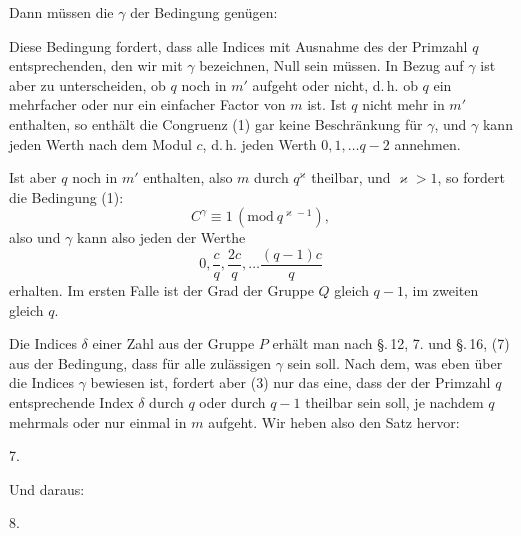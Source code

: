 
Dann müssen die $\gamma$ der Bedingung genügen:


Diese Bedingung fordert, dass alle Indices mit Ausnahme des der Primzahl $q$
entsprechenden, den wir mit $\gamma$ bezeichnen, Null sein müssen. In Bezug auf
$\gamma$ ist aber zu unterscheiden, ob $q$ noch in $m'$ aufgeht oder nicht, d.\,h.
ob $q$ ein mehrfacher oder nur ein einfacher Factor von $m$ ist. Ist $q$ nicht
mehr in $m'$ enthalten, so enthält die Congruenz (1) gar keine Beschränkung für
$\gamma$, und $\gamma$ kann jeden Werth nach dem Modul $c$, d.\,h. jeden Werth
$0, 1, \dots q - 2$ annehmen.

Ist aber $q$ noch in $m'$ enthalten, also $m$ durch $q^\varkappa$ theilbar, und $\varkappa > 1$,
so fordert die Bedingung (1):
\[
C^\gamma \equiv 1 \, (\mathrm{mod}\ q^{\varkappa-1}),
\]
also
und $\gamma$ kann also jeden der Werthe
\[
0, \dfrac{c}{q}, \dfrac{2c}{q}, \dots \dfrac{(q-1)c}{q}
\]
erhalten. Im ersten Falle ist der Grad der Gruppe $Q$ gleich $q - 1$, im
zweiten gleich $q$.

Die Indices $\delta$ einer Zahl aus der Gruppe $P$ erhält man nach \S.\,12, 7.
und \S.\,16, (7) aus der Bedingung, dass für alle zulässigen $\gamma$
sein soll. Nach dem, was eben über die Indices $\gamma$ bewiesen ist, fordert
aber (3) nur das eine, dass der der Primzahl $q$ entsprechende Index $\delta$
durch $q$ oder durch $q - 1$ theilbar sein soll, je nachdem $q$ mehrmals oder
nur einmal in $m$ aufgeht. Wir heben also den Satz hervor:

7. 

Und daraus:

8. 
